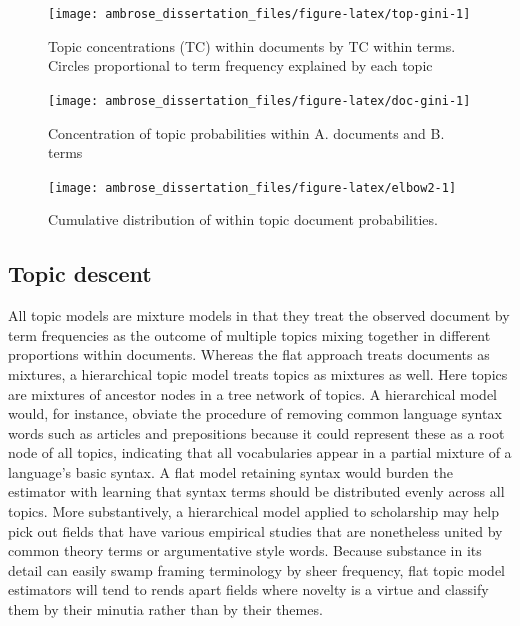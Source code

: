 \documentclass[]{book}
\theoremstyle{definition}
\theoremstyle{definition}
\theoremstyle{definition}
\theoremstyle{remark}
\begin{document}
\begin{figure}

{\centering \texttt{[image: ambrose\_dissertation\_files/figure-latex/top-gini-1]} 

}

\caption{Topic concentrations (TC) within documents by TC within terms. Circles proportional to term frequency explained by each topic}\label{fig:top-gini}
\end{figure}

\begin{figure}

{\centering \texttt{[image: ambrose\_dissertation\_files/figure-latex/doc-gini-1]} 

}

\caption{Concentration of topic probabilities within A. documents and B. terms}\label{fig:doc-gini}
\end{figure}

\begin{figure}

{\centering \texttt{[image: ambrose\_dissertation\_files/figure-latex/elbow2-1]} 

}

\caption{Cumulative distribution of within topic document probabilities.}\label{fig:elbow2}
\end{figure}

\hypertarget{topic-descent}{%
\subsection{Topic descent}\label{topic-descent}}

All topic models are mixture models in that they treat the observed
document by term frequencies as the outcome of multiple topics mixing
together in different proportions within documents. Whereas the flat
approach treats documents as mixtures, a hierarchical topic model treats
topics as mixtures as well. Here topics are mixtures of ancestor nodes
in a tree network of topics. A hierarchical model would, for instance,
obviate the procedure of removing common language syntax words such as
articles and prepositions because it could represent these as a root
node of all topics, indicating that all vocabularies appear in a partial
mixture of a language's basic syntax. A flat model retaining syntax
would burden the estimator with learning that syntax terms should be
distributed evenly across all topics. More substantively, a hierarchical
model applied to scholarship may help pick out fields that have various
empirical studies that are nonetheless united by common theory terms or
argumentative style words. Because substance in its detail can easily
swamp framing terminology by sheer frequency, flat topic model
estimators will tend to rends apart fields where novelty is a virtue and
classify them by their minutia rather than by their themes.
\end{document}
